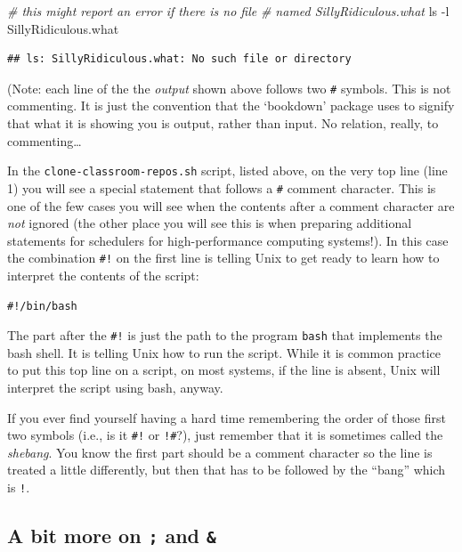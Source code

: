 \documentclass[]{krantz}
\makeatletter
\newenvironment{Shaded}{\begin{snugshade}}{\end{snugshade}}
\newcommand{\CommentTok}[1]{\textcolor[rgb]{0.37,0.37,0.37}{\textit{#1}}}
\newcommand{\FunctionTok}[1]{\textcolor[rgb]{0,0,0}{#1}}
\newcommand{\NormalTok}[1]{#1}
\newenvironment{kframe}{%
\medskip{}
\setlength{\fboxsep}{.8em}
 \def\at@end@of@kframe{}%
 \ifinner\ifhmode%
  \def\at@end@of@kframe{\end{minipage}}%
  \begin{minipage}{\columnwidth}%
 \fi\fi%
 \def\FrameCommand##1{\hskip\@totalleftmargin \hskip-\fboxsep
 \colorbox{shadecolor}{##1}\hskip-\fboxsep
     \hskip-\linewidth \hskip-\@totalleftmargin \hskip\columnwidth}%
 \MakeFramed {\advance\hsize-\width
   \@totalleftmargin\z@ \linewidth\hsize
   \@setminipage}}%
 {\par\unskip\endMakeFramed%
 \at@end@of@kframe}
\renewenvironment{Shaded}{\begin{kframe}}{\end{kframe}}
\makeatother
\begin{document}
\begin{Shaded}
\begin{Highlighting}[]
\CommentTok{# this might report an error if there is no file}
\CommentTok{# named SillyRidiculous.what}
\FunctionTok{ls}\NormalTok{ -l SillyRidiculous.what}
\end{Highlighting}
\end{Shaded}

\begin{verbatim}
## ls: SillyRidiculous.what: No such file or directory
\end{verbatim}

(Note: each line of the the \emph{output} shown above follows two \texttt{\#} symbols. This
is not commenting. It is just the convention that the `bookdown' package uses to signify that
what it is showing you is output, rather than input. No relation, really, to commenting\ldots{}

In the \texttt{clone-classroom-repos.sh} script, listed above, on the very top line (line 1) you will see
a special statement that follows a \texttt{\#} comment character. This is one of the few cases you will
see when the contents after a comment character are \emph{not} ignored (the other place you will see this
is when preparing additional statements for schedulers for high-performance computing systems!).
In this case the combination \texttt{\#!} on the first line is telling Unix to get ready to learn how
to interpret the contents of the script:

\begin{verbatim}
#!/bin/bash
\end{verbatim}

The part after the \texttt{\#!} is just
the path to the program \texttt{bash} that implements the bash shell. It is telling Unix
how to run the script. While it is common practice to put this top line on a script,
on most systems, if the line is absent, Unix will interpret the script using bash, anyway.

If you ever find yourself having a hard time remembering the order of those first two
symbols (i.e., is it \texttt{\#!} or \texttt{!\#}?), just remember that it is sometimes called
the \emph{shebang}. You know the first part should be a comment character so the line is treated
a little differently, but then that has to be followed by the ``bang'' which is \texttt{!}.

\hypertarget{paragraph-before-shebang}{%
\subsection{\texorpdfstring{A bit more on \texttt{;} and \texttt{\&}}{A bit more on ; and \&}}\label{paragraph-before-shebang}}
\end{document}

